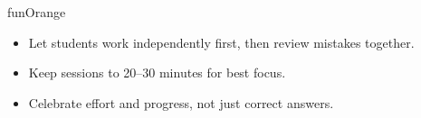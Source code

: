 {\begin{center}
\begin{minipage}{0.84\textwidth}
\begin{wbDashBox}{funOrange}
    \begin{itemize}[leftmargin=1.2em, itemsep=2pt]
        \item[\textcolor{funOrangeDark}{\faAngleDoubleRight}]
            Let students work independently first, then review
            mistakes together.
        \item[\textcolor{funOrangeDark}{\faAngleDoubleRight}]
            Keep sessions to 20--30 minutes for best focus.
        \item[\textcolor{funOrangeDark}{\faAngleDoubleRight}]
            Celebrate effort and progress, not just correct answers.
    \end{itemize}
\end{wbDashBox}
\end{minipage}
\end{center}

}

\clearpage
